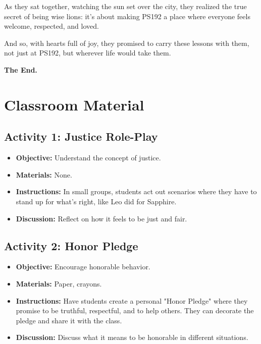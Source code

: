 \documentclass[11pt]{article}
\begin{document}
As they sat together, watching the sun set over the city, they realized the true secret of being wise lions: it’s about making PS192 a place where everyone feels welcome, respected, and loved.

And so, with hearts full of joy, they promised to carry these lessons with them, not just at PS192, but wherever life would take them.

\textbf{The End.}

\section{Classroom Material}
\label{sec:org5a5d1ad}

\subsection{Activity 1: Justice Role-Play}
\label{sec:org895cc33}
\begin{itemize}
\item \textbf{\textbf{Objective:}} Understand the concept of justice.
\item \textbf{\textbf{Materials:}} None.
\item \textbf{\textbf{Instructions:}} In small groups, students act out scenarios where they have to stand up for what’s right, like Leo did for Sapphire.
\item \textbf{\textbf{Discussion:}} Reflect on how it feels to be just and fair.
\end{itemize}

\subsection{Activity 2: Honor Pledge}
\label{sec:org11aa15d}
\begin{itemize}
\item \textbf{\textbf{Objective:}} Encourage honorable behavior.
\item \textbf{\textbf{Materials:}} Paper, crayons.
\item \textbf{\textbf{Instructions:}} Have students create a personal "Honor Pledge" where they promise to be truthful, respectful, and to help others. They can decorate the pledge and share it with the class.
\item \textbf{\textbf{Discussion:}} Discuss what it means to be honorable in different situations.
\end{itemize}
\end{document}

